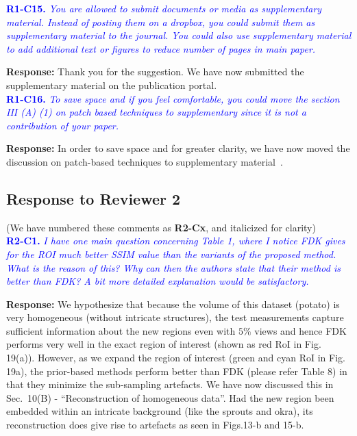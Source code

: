 \documentclass{article}
\begin{document}
\textcolor{blue}{\textbf{R1-C15.}\textit{ You are allowed to submit documents or media as supplementary material. Instead of posting them on a dropbox, you could submit them as supplementary material to the journal. You could also use supplementary material to add additional text or figures to reduce number of pages in main paper.}}
    
\textbf{Response:} Thank you for the suggestion. We have now submitted the supplementary material  on the publication portal. \\

\textcolor{blue}{\textbf{R1-C16.}\textit{ To save space and if you feel comfortable, you could move the section III (A) (1) on patch based techniques to supplementary since it is not a contribution of your paper.}}
    
\textbf{Response:} In order to save space and for greater clarity, we have now moved the discussion on patch-based techniques to supplementary material~\cite{supp_paper}.

\subsection{Response to Reviewer 2}
(We have numbered these comments as \textbf{R2-Cx}, and italicized for clarity)\\

\textcolor{blue}{\textbf{R2-C1.}\textit{ I have one main question concerning Table 1, where I notice FDK gives for the ROI much better SSIM value than the variants of the proposed method. What is the reason of this? Why can then the authors state that their method is better than FDK? A bit more detailed explanation would be satisfactory.}}

\textbf{Response:} We hypothesize that because the volume of this dataset (potato) is very homogeneous (without intricate  structures), the test measurements capture sufficient information about the new regions even with $5\%$ views and hence FDK performs very well in the exact region of interest (shown as red RoI in Fig. 19(a)). However, as we expand the region of interest (green and cyan RoI in Fig. 19a), the prior-based methods perform better than FDK (please refer Table 8) in that they minimize the sub-sampling artefacts.  We have now discussed this in Sec.~10(B) - ``Reconstruction of homogeneous data''.
Had the new region been embedded within an intricate background (like the sprouts and okra), its reconstruction does give rise to artefacts as seen in Figs.13-b and 15-b. \\
\end{document}
